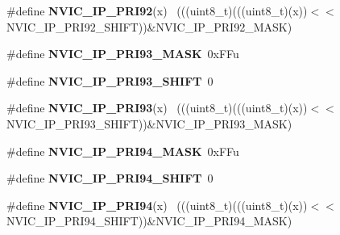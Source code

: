 \begin{DoxyCompactItemize}
\item 
\hypertarget{group___n_v_i_c___register___masks_gac45314576cf150b22f24f7f4a7b82e20}{}\#define {\bfseries N\+V\+I\+C\+\_\+\+I\+P\+\_\+\+P\+R\+I92}(x)                                              ~(((uint8\+\_\+t)(((uint8\+\_\+t)(x))$<$$<$N\+V\+I\+C\+\_\+\+I\+P\+\_\+\+P\+R\+I92\+\_\+\+S\+H\+I\+F\+T))\&N\+V\+I\+C\+\_\+\+I\+P\+\_\+\+P\+R\+I92\+\_\+\+M\+A\+S\+K)\label{group___n_v_i_c___register___masks_gac45314576cf150b22f24f7f4a7b82e20}

\item 
\hypertarget{group___n_v_i_c___register___masks_ga9182828a20e7d9d26248087856410b9a}{}\#define {\bfseries N\+V\+I\+C\+\_\+\+I\+P\+\_\+\+P\+R\+I93\+\_\+\+M\+A\+S\+K}~0x\+F\+Fu\label{group___n_v_i_c___register___masks_ga9182828a20e7d9d26248087856410b9a}

\item 
\hypertarget{group___n_v_i_c___register___masks_gac791f54901714bc4a2ff19b48846a780}{}\#define {\bfseries N\+V\+I\+C\+\_\+\+I\+P\+\_\+\+P\+R\+I93\+\_\+\+S\+H\+I\+F\+T}~0\label{group___n_v_i_c___register___masks_gac791f54901714bc4a2ff19b48846a780}

\item 
\hypertarget{group___n_v_i_c___register___masks_ga4581ff389f41d53fc577686b5f5b45ea}{}\#define {\bfseries N\+V\+I\+C\+\_\+\+I\+P\+\_\+\+P\+R\+I93}(x)                                              ~(((uint8\+\_\+t)(((uint8\+\_\+t)(x))$<$$<$N\+V\+I\+C\+\_\+\+I\+P\+\_\+\+P\+R\+I93\+\_\+\+S\+H\+I\+F\+T))\&N\+V\+I\+C\+\_\+\+I\+P\+\_\+\+P\+R\+I93\+\_\+\+M\+A\+S\+K)\label{group___n_v_i_c___register___masks_ga4581ff389f41d53fc577686b5f5b45ea}

\item 
\hypertarget{group___n_v_i_c___register___masks_ga5fbebd3cbe4a186d0bbb4371361fd592}{}\#define {\bfseries N\+V\+I\+C\+\_\+\+I\+P\+\_\+\+P\+R\+I94\+\_\+\+M\+A\+S\+K}~0x\+F\+Fu\label{group___n_v_i_c___register___masks_ga5fbebd3cbe4a186d0bbb4371361fd592}

\item 
\hypertarget{group___n_v_i_c___register___masks_gafe7eb8cc16ac13d0f16630e5a191731b}{}\#define {\bfseries N\+V\+I\+C\+\_\+\+I\+P\+\_\+\+P\+R\+I94\+\_\+\+S\+H\+I\+F\+T}~0\label{group___n_v_i_c___register___masks_gafe7eb8cc16ac13d0f16630e5a191731b}

\item 
\hypertarget{group___n_v_i_c___register___masks_ga4bda0cba59746c8fbd75690d328ba985}{}\#define {\bfseries N\+V\+I\+C\+\_\+\+I\+P\+\_\+\+P\+R\+I94}(x)                                              ~(((uint8\+\_\+t)(((uint8\+\_\+t)(x))$<$$<$N\+V\+I\+C\+\_\+\+I\+P\+\_\+\+P\+R\+I94\+\_\+\+S\+H\+I\+F\+T))\&N\+V\+I\+C\+\_\+\+I\+P\+\_\+\+P\+R\+I94\+\_\+\+M\+A\+S\+K)\label{group___n_v_i_c___register___masks_ga4bda0cba59746c8fbd75690d328ba985}


\end{DoxyCompactItemize}
